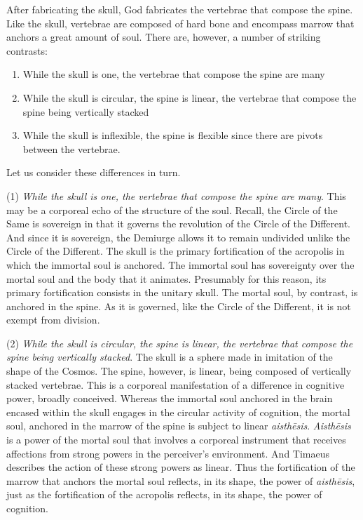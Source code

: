 After fabricating the skull, God fabricates the vertebrae that compose the spine. Like the skull, vertebrae are composed of hard bone and encompass marrow that anchors a great amount of soul. There are, however, a number of striking contrasts:
\begin{enumerate}[(1)]
	\item While the skull is one, the vertebrae that compose the spine are many
	\item While the skull is circular, the spine is linear, the vertebrae that compose the spine being vertically stacked
	\item While the skull is inflexible, the spine is flexible since there are pivots between the vertebrae.
\end{enumerate}
Let us consider these differences in turn.

(1) \emph{While the skull is one, the vertebrae that compose the spine are many}. This may be a corporeal echo of the structure of the soul. Recall, the Circle of the Same is sovereign in that it governs the revolution of the Circle of the Different. And since it is sovereign, the Demiurge allows it to remain undivided unlike the Circle of the Different. The skull is the primary fortification of the acropolis in which the immortal soul is anchored. The immortal soul has sovereignty over the mortal soul and the body that it animates. Presumably for this reason, its primary fortification consists in the unitary skull. The mortal soul, by contrast, is anchored in the spine. As it is governed, like the Circle of the Different, it is not exempt from division.

(2) \emph{While the skull is circular, the spine is linear, the vertebrae that compose the spine being vertically stacked}. The skull is a sphere made in imitation of the shape of the Cosmos. The spine, however, is linear, being composed of vertically stacked vertebrae. This is a corporeal manifestation of a difference in cognitive power, broadly conceived. Whereas the immortal soul anchored in the brain encased within the skull engages in the circular activity of cognition, the mortal soul, anchored in the marrow of the spine is subject to linear \emph{aisthēsis}. \emph{Aisthēsis} is a power of the mortal soul that involves a corporeal instrument that receives affections from strong powers in the perceiver’s environment. And Timaeus describes the action of these strong powers as linear. Thus the fortification of the marrow that anchors the mortal soul reflects, in its shape, the power of \emph{aisthēsis}, just as the fortification of the acropolis reflects, in its shape, the power of cognition.

